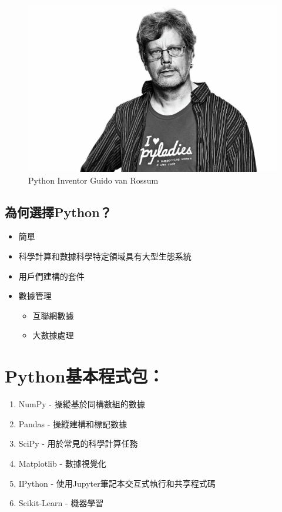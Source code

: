 \documentclass[]{book}
\providecommand{\tightlist}{%
  \setlength{\itemsep}{0pt}\setlength{\parskip}{0pt}}
\begin{document}
\begin{figure}

\hfill{}\includegraphics[width=0.5\linewidth]{Pythoninventor} 

\caption{Python Inventor Guido van Rossum}\label{fig:Pythoninventor}
\end{figure}

\hypertarget{python-2}{%
\subsection{為何選擇Python？}\label{python-2}}

\begin{itemize}
\tightlist
\item
  簡單
\item
  科學計算和數據科學特定領域具有大型生態系統
\item
  用戶們建構的套件
\item
  數據管理

  \begin{itemize}
  \tightlist
  \item
    互聯網數據
  \item
    大數據處理
  \end{itemize}
\end{itemize}

\hypertarget{python-3}{%
\section{Python基本程式包：}\label{python-3}}

\begin{enumerate}
\def\labelenumi{\arabic{enumi}.}
\tightlist
\item
  NumPy - 操縱基於同構數組的數據
\item
  Pandas - 操縱建構和標記數據
\item
  SciPy - 用於常見的科學計算任務
\item
  Matplotlib - 數據視覺化
\item
  IPython - 使用Jupyter筆記本交互式執行和共享程式碼
\item
  Scikit-Learn - 機器學習
\end{enumerate}
\end{document}
